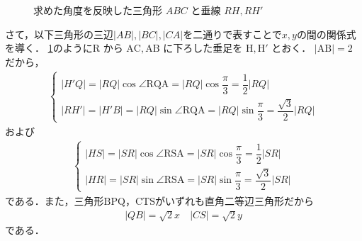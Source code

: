 \documentclass[../../main.tex]{subfiles}
\begin{document}
\begin{figure}[htb]
  \caption{求めた角度を反映した三角形 $ABC$ と垂線 $RH, RH'$}
  \label{fig:triangle_abc_angles}
\end{figure}

さて，以下三角形の三辺$|AB|,|BC|,|CA|$を二通りで表すことで$x,y$の間の関係式を導く．
\cref{fig:triangle_abc_angles}のように$\mathrm{R}$ から $\mathrm{AC}, \mathrm{AB}$ に下ろした垂足を $\mathrm{H}, \mathrm{H'}$ とおく．
$|\mathrm{AB}| = 2$ だから，
\begin{align}
  \begin{cases}
    |H'Q| = |RQ|\cos\angle\mathrm{RQA} = |RQ|\cos\dfrac{\pi}{3} = \dfrac{1}{2}|RQ| \\
    |RH'| = |H'B| = |RQ|\sin\angle\mathrm{RQA} = |RQ|\sin\dfrac{\pi}{3} =  \dfrac{\sqrt{3}}{2}|RQ|
  \end{cases} \label{eq:9}
\end{align}
および
\begin{align}
  \begin{cases}
    |HS| = |SR|\cos\angle\mathrm{RSA} = |SR|\cos\dfrac{\pi}{3} = \dfrac{1}{2}|SR| \\
    |HR| = |SR|\sin\angle\mathrm{RSA}= |SR|\sin\dfrac{\pi}{3} = \dfrac{\sqrt{3}}{2}|SR|
  \end{cases} \label{eq:10}
\end{align}
である．また，三角形$\mathrm{BPQ}$，$\mathrm{CTS}$がいずれも直角二等辺三角形だから
\begin{align}
  |QB| = \sqrt{2}x \quad |CS| = \sqrt{2}y \label{eq:11}
\end{align}
である．
\end{document}
